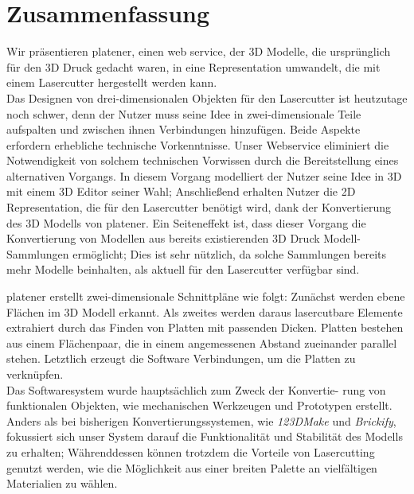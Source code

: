 \pagebreak


\chapter*{Zusammenfassung}

Wir präsentieren platener, einen web service, der 3D Modelle, die ursprünglich für den 3D Druck gedacht waren, in eine Representation umwandelt, die mit einem Lasercutter hergestellt werden kann.\\
Das Designen von drei-dimensionalen Objekten für den Lasercutter ist heutzutage noch schwer, denn der Nutzer muss seine Idee in zwei-dimensionale Teile aufspalten und zwischen ihnen Verbindungen hinzufügen. Beide Aspekte erfordern erhebliche technische Vorkenntnisse. Unser Webservice eliminiert die Notwendigkeit von solchem technischen Vorwissen durch die Bereitstellung eines alternativen Vorgangs. In diesem Vorgang modelliert der Nutzer seine Idee in 3D mit einem 3D Editor seiner Wahl; Anschließend erhalten Nutzer die 2D Representation, die für den Lasercutter benötigt wird, dank der Konvertierung des 3D Modells von platener. Ein Seiteneffekt ist, dass dieser Vorgang die Konvertierung von Modellen aus bereits existierenden 3D Druck Modell-Sammlungen ermöglicht; Dies ist sehr nützlich, da solche Sammlungen bereits mehr Modelle beinhalten, als aktuell für den Lasercutter verfügbar sind.

\bigskip
platener erstellt zwei-dimensionale Schnittpläne wie folgt: Zunächst werden ebene Flächen im 3D Modell erkannt. Als zweites werden daraus lasercutbare Elemente extrahiert durch das Finden von Platten mit passenden Dicken. Platten bestehen aus einem Flächenpaar, die in einem angemessenen Abstand zueinander parallel stehen. Letztlich erzeugt die Software Verbindungen, um die Platten zu verknüpfen.\\
Das Softwaresystem wurde hauptsächlich zum Zweck der Konvertie- rung von funktionalen Objekten, wie mechanischen Werkzeugen und Prototypen erstellt. Anders als bei bisherigen Konvertierungssystemen, wie \emph{123DMake} und \emph{Brickify}, fokussiert sich unser System darauf die Funktionalität und Stabilität des Modells zu erhalten; Währenddessen können trotzdem die Vorteile von Lasercutting genutzt werden, wie die Möglichkeit aus einer breiten Palette an vielfältigen Materialien zu wählen.



\endgroup			

\vfill
